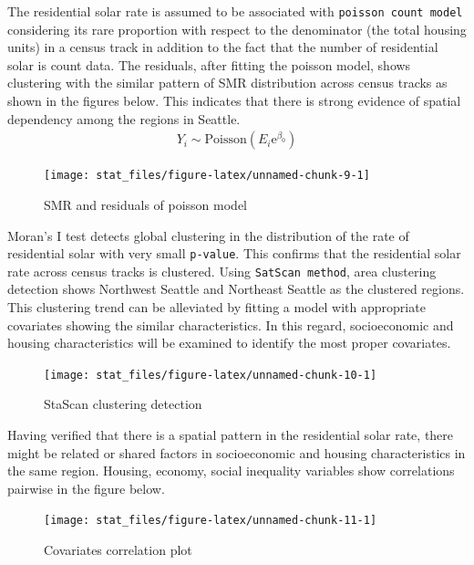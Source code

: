 \documentclass[11pt,]{article}
\begin{document}
The residential solar rate is assumed to be associated with
\texttt{poisson\ count\ model} considering its rare proportion with
respect to the denominator (the total housing units) in a census track
in addition to the fact that the number of residential solar is count
data. The residuals, after fitting the poisson model, shows clustering
with the similar pattern of SMR distribution across census tracks as
shown in the figures below. This indicates that there is strong evidence
of spatial dependency among the regions in Seattle. \[
\begin{aligned}
Y_i \sim \mbox{Poisson}(E_i \mbox{e}^{\beta_{0}})
\end{aligned}
\]

\begin{figure}

{\centering \texttt{[image: stat\_files/figure-latex/unnamed-chunk-9-1]} 

}

\caption{SMR and residuals of poisson model}\label{fig:unnamed-chunk-9}
\end{figure}

Moran's I test detects global clustering in the distribution of the rate
of residential solar with very small \texttt{p-value}. This confirms
that the residential solar rate across census tracks is clustered. Using
\texttt{SatScan\ method}, area clustering detection shows Northwest
Seattle and Northeast Seattle as the clustered regions. This clustering
trend can be alleviated by fitting a model with appropriate covariates
showing the similar characteristics. In this regard, socioeconomic and
housing characteristics will be examined to identify the most proper
covariates.

\begin{figure}

{\centering \texttt{[image: stat\_files/figure-latex/unnamed-chunk-10-1]} 

}

\caption{StaScan clustering detection}\label{fig:unnamed-chunk-10}
\end{figure}

Having verified that there is a spatial pattern in the residential solar
rate, there might be related or shared factors in socioeconomic and
housing characteristics in the same region. Housing, economy, social
inequality variables show correlations pairwise in the figure below.

\begin{figure}

{\centering \texttt{[image: stat\_files/figure-latex/unnamed-chunk-11-1]} 

}

\caption{Covariates correlation plot}\label{fig:unnamed-chunk-11}
\end{figure}
\end{document}
